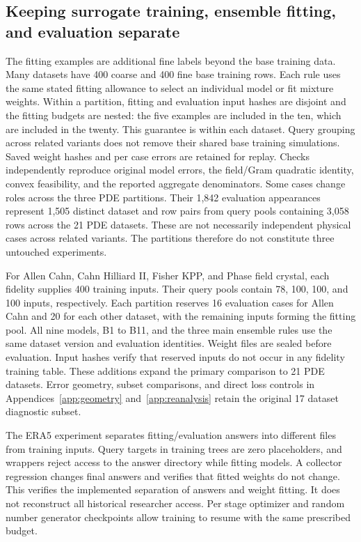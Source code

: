 \subsection{Keeping surrogate training, ensemble fitting, and evaluation separate}
The fitting examples are additional fine labels beyond the base training
data. Many datasets have 400 coarse and 400 fine base training rows. Each rule
uses the same stated fitting allowance to select an individual model or fit
mixture weights.
Within a partition, fitting and evaluation input hashes are disjoint and the fitting
budgets are nested: the five examples are included in the ten, which are
included in the twenty. This guarantee is within each dataset. Query grouping
across related variants does not remove their shared base training simulations.
Saved weight hashes and per case
errors are retained for replay. Checks independently reproduce original model errors,
the field/Gram quadratic identity, convex feasibility, and the reported aggregate denominators.
Some cases change roles across the three PDE partitions. Their 1,842
evaluation appearances represent 1,505 distinct dataset and row pairs from
query pools containing 3,058 rows across the 21 PDE datasets. These
are not necessarily independent physical cases across related variants.
The partitions therefore do not constitute three untouched experiments.

For Allen Cahn, Cahn Hilliard II, Fisher KPP, and Phase field crystal, each
fidelity supplies 400 training inputs. Their query pools contain 78, 100, 100,
and 100 inputs, respectively. Each partition reserves 16 evaluation cases for
Allen Cahn and 20 for each other dataset, with the remaining inputs forming
the fitting pool. All nine models, B1 to B11, and the three main ensemble rules
use the same dataset version and evaluation identities. Weight files are sealed
before evaluation. Input hashes verify that reserved inputs do not occur in
any fidelity training table. These additions expand the primary comparison to
21 PDE datasets. Error geometry, subset comparisons, and direct loss
controls in Appendices~\ref{app:geometry} and~\ref{app:reanalysis} retain the
original 17 dataset diagnostic subset.

The ERA5 experiment separates fitting/evaluation answers into different files from
training inputs. Query targets in training trees are zero placeholders, and wrappers reject
access to the answer directory while fitting models. A collector regression changes final
answers and verifies that fitted weights do not change. This verifies the implemented separation of answers and weight fitting.
It does not reconstruct all historical researcher access.
Per stage optimizer and random number generator checkpoints allow training to
resume with the same prescribed budget.

